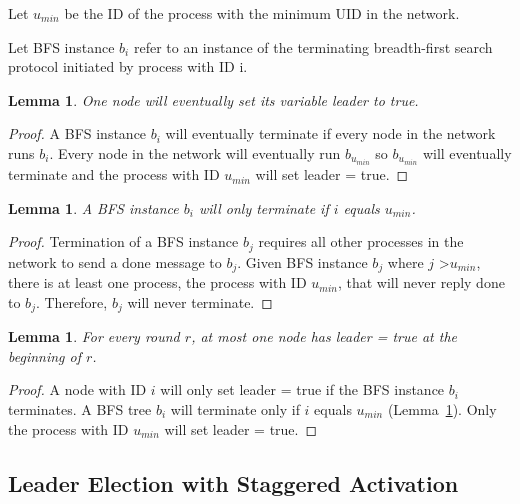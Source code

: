 \documentclass[english]{article}
\newtheorem{lemma}[theorem]{Lemma}
\begin{document}
\begin{definition}
Let $u_{min}$ be the ID of the process with the minimum UID in the network. 
\end{definition}

\begin{definition}
Let BFS instance $b_i$ refer to an instance of the terminating breadth-first search protocol initiated by process with ID i.
\end{definition}


\begin{lemma}
\label{LELivenessStatic}
  One node will eventually set its variable leader to true.
\end{lemma}
\begin{proof}
A BFS instance $b_i$ will eventually terminate if every node in the network runs $b_i$. 
Every node in the network will eventually run $b_{u_{min}}$ so $b_{u_{min}}$ will eventually terminate and the process with ID $u_{min}$ will set leader = true.
\end{proof}


\begin{lemma}
\label{BFSTermination}
  A BFS instance $b_i$ will only terminate if $i$ equals $u_{min}$.
\end{lemma}
\begin{proof}
Termination of a BFS instance $b_j$ requires all other processes in the network to send a done message to $b_j$.
Given BFS instance $b_j$ where $j$ \textgreater $u_{min}$, there is at least one process, the process with ID $u_{min}$, that will never reply done to $b_j$.
Therefore, $b_j$ will never terminate.
\end{proof}


\begin{lemma}
\label{LESafetyStatic}
For every round $r$, at most one node has leader = true at the beginning of $r$.
\end{lemma}
\begin{proof}
A node with ID $i$ will only set leader = true if the BFS instance $b_i$ terminates.
A BFS tree $b_i$ will terminate only if $i$ equals $u_{min}$ (Lemma~\ref{BFSTermination}).
Only the process with ID $u_{min}$ will set leader = true. 
\end{proof}




\subsection{Leader Election with Staggered Activation}
\end{document}
